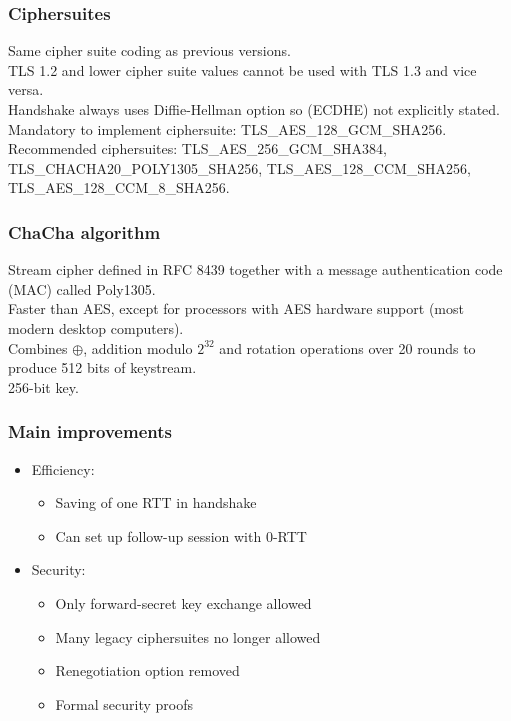 \documentclass{article}
\begin{document}
\subsubsection{Ciphersuites}

Same cipher suite coding as previous versions.\\
TLS 1.2 and lower cipher suite values cannot be used with TLS 1.3 and vice versa.\\
Handshake always uses Diffie-Hellman option so (ECDHE) not explicitly stated.\\
Mandatory to implement ciphersuite: TLS\_AES\_128\_GCM\_SHA256.\\
Recommended ciphersuites: TLS\_AES\_256\_GCM\_SHA384, TLS\_CHACHA20\_POLY1305\_SHA256, TLS\_AES\_128\_CCM\_SHA256, TLS\_AES\_128\_CCM\_8\_SHA256.

\subsubsection{ChaCha algorithm}

Stream cipher defined in RFC 8439 together with a message authentication code (MAC) called Poly1305.\\
Faster than AES, except for processors with AES hardware support (most modern desktop computers).\\
Combines $\oplus$, addition modulo $2^32$ and rotation operations over 20 rounds to produce 512 bits of keystream.\\
256-bit key.

\subsubsection{Main improvements}

\begin{itemize}
    \item Efficiency:
    \begin{itemize}
        \item Saving of one RTT in handshake
        \item Can set up follow-up session with 0-RTT
    \end{itemize}
    \item Security:
    \begin{itemize}
        \item Only forward-secret key exchange allowed
        \item Many legacy ciphersuites no longer allowed
        \item Renegotiation option removed
        \item Formal security proofs
    \end{itemize}
\end{itemize}
\end{document}
